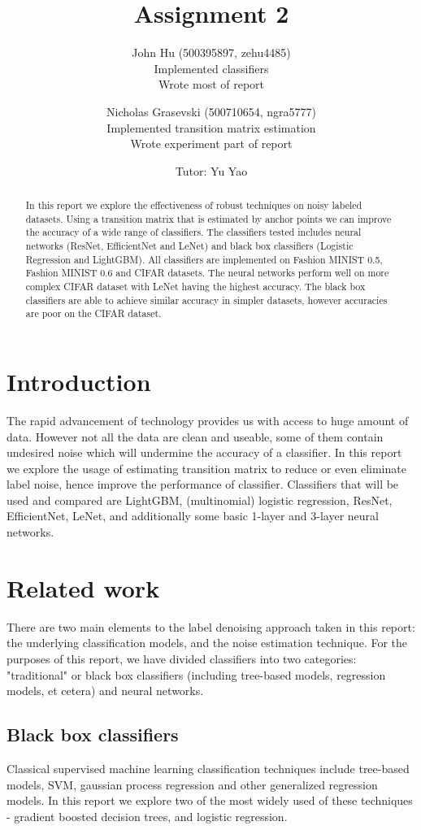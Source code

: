 \documentclass{article} %
\title{Assignment 2}
\author{
  John Hu (500395897, zehu4485)\\
  Implemented classifiers\\
  Wrote most of report
  \and
  Nicholas Grasevski (500710654, ngra5777)\\
  Implemented transition matrix estimation\\
  Wrote experiment part of report
  \and
  Tutor: Yu Yao
}
\begin{document}
\maketitle

\begin{abstract}
In this report we explore the effectiveness of robust techniques on noisy labeled datasets. Using a transition matrix that is estimated by anchor points we can improve the accuracy of a wide range of classifiers. The classifiers tested includes neural networks (ResNet, EfficientNet and LeNet) and black box classifiers (Logistic Regression and LightGBM). All classifiers are implemented on Fashion MINIST 0.5, Fashion MINIST 0.6 and CIFAR datasets. The neural networks perform well on more complex CIFAR dataset with LeNet having the highest accuracy. The black box classifiers are able to achieve similar accuracy in simpler datasets, however accuracies are poor on the CIFAR dataset.
\end{abstract}

\section{Introduction}
The rapid advancement of technology provides us with access to huge amount of data. However not all the data are clean and useable, some of them contain undesired noise which will undermine the accuracy of a classifier. In this report we explore the usage of estimating transition matrix to reduce or even eliminate label noise, hence improve the performance of classifier. Classifiers that will be used and compared are LightGBM, (multinomial) logistic regression, ResNet, EfficientNet, LeNet, and additionally some basic 1-layer and 3-layer neural networks.

\section{Related work}
There are two main elements to the label denoising approach taken in this report: the underlying classification models, and the noise estimation technique. For the purposes of this report, we have divided classifiers into two categories: "traditional" or black box classifiers (including tree-based models, regression models, et cetera) and neural networks.

\subsection{Black box classifiers}
Classical supervised machine learning classification techniques include tree-based models, SVM, gaussian process regression and other generalized regression models. In this report we explore two of the most widely used of these techniques - gradient boosted decision trees, and logistic regression.
\end{document}
